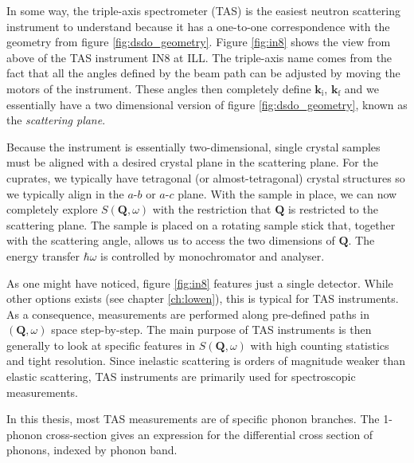 In some way, the triple-axis spectrometer (TAS) is the easiest neutron scattering instrument to understand because it has a one-to-one correspondence with the geometry from figure \ref{fig:dsdo_geometry}. Figure \ref{fig:in8} shows the view from above of the TAS instrument IN8 at ILL. The triple-axis name comes from the fact that all the angles defined by the beam path can be adjusted by moving the motors of the instrument. These angles then completely define $\bm{k}_\text{i}$, $\bm{k}_\text{f}$ and we essentially have a two dimensional version of figure \ref{fig:dsdo_geometry}, known as the \emph{scattering plane}.

Because the instrument is essentially two-dimensional, single crystal samples must be aligned with a desired crystal plane in the scattering plane. For the cuprates, we typically have tetragonal (or almost-tetragonal) crystal structures so we typically align in the $a$-$b$ or $a$-$c$ plane. With the sample in place, we can now completely explore $S(\bm{Q},\omega)$ with the restriction that $\bm{Q}$ is restricted to the scattering plane. The sample is placed on a rotating sample stick that, together with the scattering angle, allows us to access the two dimensions of $\bm{Q}$. The energy transfer $\hbar\omega$ is controlled by monochromator and analyser.

As one might have noticed, figure \ref{fig:in8} features just a single detector. While other options exists (see chapter \ref{ch:lowen}), this is typical for TAS instruments. As a consequence, measurements are performed along pre-defined paths in $(\bm{Q}, \omega)$ space step-by-step. The main purpose of TAS instruments is then generally to look at specific features in $S(\bm{Q},\omega)$ with high counting statistics and tight resolution. Since inelastic scattering is orders of magnitude weaker than elastic scattering, TAS instruments are primarily used for spectroscopic measurements.

In this thesis, most TAS measurements are of specific phonon branches. The 1-phonon cross-section gives an expression for the differential cross section of phonons, indexed by phonon band.

